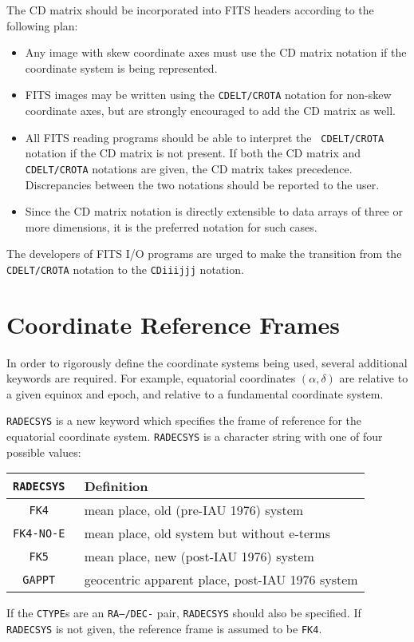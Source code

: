 The CD matrix should be incorporated into FITS headers according to the
following plan:
\begin{itemize}
\item Any image with skew coordinate axes must use the CD matrix notation
if the coordinate system is being represented.
\item FITS images may be written using the {\tt CDELT/CROTA} notation for
non-skew coordinate axes, but are strongly encouraged to add the CD matrix
as well.
\item All FITS reading programs should be able to interpret the {\tt
CDELT/CROTA} notation if the CD matrix is not present.  If both the CD matrix
and {\tt CDELT/CROTA} notations are given, the CD matrix takes precedence.
Discrepancies between the two notations should be reported to the user. 
\item Since the CD matrix notation is directly extensible to data arrays of
three or more dimensions, it is the preferred notation for such cases. 
\end{itemize}

The developers of FITS I/O programs are urged to make the transition from the
{\tt CDELT/CROTA} notation to the {\tt CDiiijjj} notation. 

\section{Coordinate Reference Frames}
\label{sec-refframes}

In order to rigorously define the coordinate systems being used, several
additional keywords are required.  For example, equatorial coordinates
$(\alpha,\delta)$ are relative to a given equinox and epoch, and relative
to a fundamental coordinate system.

{\tt RADECSYS} is a new keyword which specifies the frame of reference for
the equatorial coordinate system.  {\tt RADECSYS} is a character string with
one of four possible values: 
\begin{center} \begin{tabular}{cl}
\tt RADECSYS & Definition \\
\hline
\tt FK4 & mean place, old (pre-IAU 1976) system \\
\tt FK4-NO-E & mean place, old system but without e-terms \\
\tt FK5 & mean place, new (post-IAU 1976) system \\
\tt GAPPT & geocentric apparent place, post-IAU 1976 system \\
\end{tabular} \end{center}
If the {\tt CTYPE}s are an {\tt RA--/DEC-} pair, {\tt RADECSYS} should also
be specified.  If {\tt RADECSYS} is not given, the reference frame is assumed
to be {\tt FK4}.

